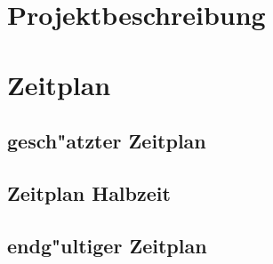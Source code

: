 \documentclass [a4paper,10pt] {article}
\begin{document}
\newpage
	\section{Projektbeschreibung}
\newpage
	\section{Zeitplan}
		\vfill
		\subsection{gesch"atzter Zeitplan}
		\vfill
		\subsection{Zeitplan Halbzeit}
		\vfill
		\subsection{endg"ultiger Zeitplan}
		\vfill
\end{document}
